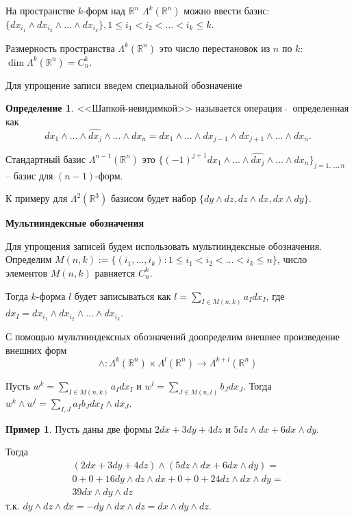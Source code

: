 \documentclass[a5paper]{article}
\newcounter{through}
\theoremstyle{plain}
\theoremstyle{definition}
\newtheorem{definition}[through]{Определение}
\newtheorem{example}[through]{Пример}
\numberwithin{through}{section}
\numberwithin{equation}{section}
\begin{document}
На пространстве $k$-форм над $\mathbb{R}^n$ $\Lambda^k(\mathbb{R}^n)$ можно ввести базис: $\{
dx_{i_1} \wedge dx_{i_2} \wedge\ldots\wedge dx_{i_k} \}, 1\leq i_1 < i_2 < \ldots < i_k \leq k$.

Размерность пространства $\Lambda^k(\mathbb{R}^n)$ это число перестановок из $n$ по $k$: $\dim \Lambda^k(\mathbb{R}^n) = 
C_n^k$.

Для упрощение записи введем специальной обозначение 

\begin{definition}
	<<Шапкой-невидимкой>> называется операция $\ \widehat{ } \ $ определенная как
	\[ dx_1 \wedge\ldots\wedge\widehat{dx_j}\wedge\ldots\wedge dx_n = dx_1 
	\wedge\ldots\wedge dx_{j-1}\wedge dx_{j+1}\wedge\ldots\wedge dx_n. \]
	
\end{definition}



Стандартный базис $\Lambda^{n-1}(\mathbb{R}^n)$ это 
$\{ (-1)^{j+1} dx_1\wedge\ldots\wedge \widehat{ dx_j } \wedge\ldots\wedge dx_n \}_{j = 1,\ldots,n}$
-- базис для $(n-1)$-форм.

К примеру для $\Lambda^2(\mathbb{R}^3)$ базисом будет набор $\{ dy\wedge dz, dz\wedge dx, dx\wedge dy \}$.

\medskip

\textbf{Мультииндексные обозначения}

Для упрощения записей будем использовать мультииндексные обозначения.
Определим $M(n,k) := \{ (i_1,\ldots,i_k): 1\leq i_1 < i_2 < \ldots < i_k \leq n \}$, число элементов
$M(n,k)$ равняется $C_n^k$.

Тогда $k$-форма $l$ будет записываться как $l = \sum\limits_{I \in M(n,k)} a_I dx_I$,
где $dx_I = dx_{i_{1}} \wedge dx_{i_{2}} \wedge\ldots\wedge dx_{i_{k}}$.

С помощью мультииндексных обозначений доопределим
внешнее произведение внешних форм
\[ \wedge : \Lambda^k(\mathbb{R}^n) \times 
\Lambda^l(\mathbb{R}^n) \to \Lambda^{k+l}(\mathbb{R}^n) \]

Пусть $w^k = \sum\limits_{I \in M(n,k)} a_I dx_I$ и 
$w^l = \sum\limits_{J \in M(n,l)} b_J dx_J$. Тогда
$ w^k \wedge w^l = \sum\limits_{I,J} a_Ib_J dx_I \wedge dx_J$.

\begin{example}
	Пусть даны две формы 
	$2dx+3dy+4dz$ и $5dz\wedge dx + 6dx\wedge dy$. 
	
	Тогда
	\begin{eqnarray}\nonumber
		(2dx+3dy+4dz)\wedge (5dz\wedge dx + 6dx\wedge dy) =
		\\\nonumber 0 + 0 + 16dy \wedge dz \wedge dx + 0 + 0 + 24dz \wedge dx \wedge dy  = 
		\\\nonumber 39dx \wedge dy \wedge dz 
	\end{eqnarray} т.к.
	$ dy \wedge dz \wedge dx = - dy \wedge dx \wedge dz = dx \wedge dy \wedge dz$.
\end{example}
\end{document}
